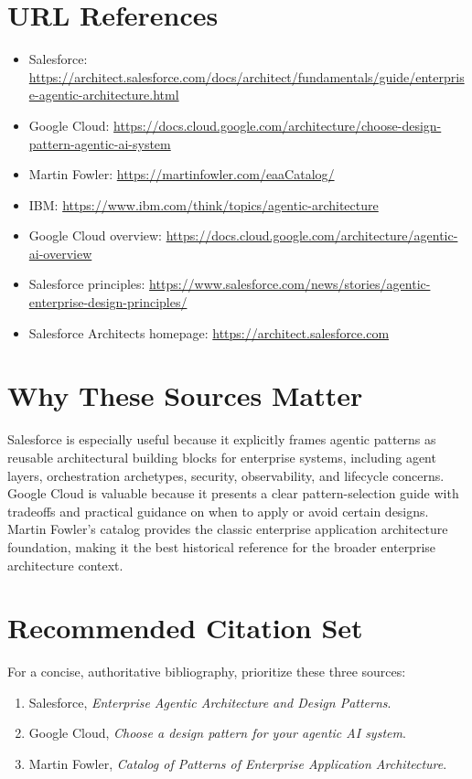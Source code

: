 \documentclass[11pt]{article}
\begin{document}
\section{URL References}
\begin{itemize}[leftmargin=*]
    \item Salesforce: \url{https://architect.salesforce.com/docs/architect/fundamentals/guide/enterprise-agentic-architecture.html}
    \item Google Cloud: \url{https://docs.cloud.google.com/architecture/choose-design-pattern-agentic-ai-system}
    \item Martin Fowler: \url{https://martinfowler.com/eaaCatalog/}
    \item IBM: \url{https://www.ibm.com/think/topics/agentic-architecture}
    \item Google Cloud overview: \url{https://docs.cloud.google.com/architecture/agentic-ai-overview}
    \item Salesforce principles: \url{https://www.salesforce.com/news/stories/agentic-enterprise-design-principles/}
    \item Salesforce Architects homepage: \url{https://architect.salesforce.com}
\end{itemize}

\section{Why These Sources Matter}
Salesforce is especially useful because it explicitly frames agentic patterns as reusable architectural building blocks for enterprise systems, including agent layers, orchestration archetypes, security, observability, and lifecycle concerns. Google Cloud is valuable because it presents a clear pattern-selection guide with tradeoffs and practical guidance on when to apply or avoid certain designs. Martin Fowler's catalog provides the classic enterprise application architecture foundation, making it the best historical reference for the broader enterprise architecture context.

\section{Recommended Citation Set}
For a concise, authoritative bibliography, prioritize these three sources:
\begin{enumerate}[leftmargin=*]
    \item Salesforce, \textit{Enterprise Agentic Architecture and Design Patterns}.
    \item Google Cloud, \textit{Choose a design pattern for your agentic AI system}.
    \item Martin Fowler, \textit{Catalog of Patterns of Enterprise Application Architecture}.
\end{enumerate}
\end{document}
